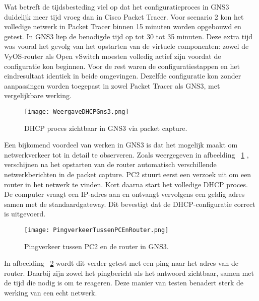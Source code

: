 \vspace{0.3cm}

Wat betreft de tijdsbesteding viel op dat het configuratieproces in GNS3 duidelijk meer tijd vroeg dan in Cisco Packet Tracer. Voor scenario 2 kon het volledige netwerk in Packet Tracer binnen 15 minuten worden opgebouwd en getest. In GNS3 liep de benodigde tijd op tot 30 tot 35 minuten. Deze extra tijd was vooral het gevolg van het opstarten van de virtuele componenten: zowel de VyOS-router als Open vSwitch moesten volledig actief zijn voordat de configuratie kon beginnen. Voor de rest waren de configuratiestappen en het eindresultaat identiek in beide omgevingen. Dezelfde configuratie kon zonder aanpassingen worden toegepast in zowel Packet Tracer als GNS3, met vergelijkbare werking.

\vspace{0.3cm}

\begin{figure}[H]
    \centering
    \texttt{[image: WeergaveDHCPGns3.png]}
    \caption{DHCP proces zichtbaar in GNS3 via packet capture.}
    \label{fig:dhcp_gns3}
\end{figure}


Een bijkomend voordeel van werken in GNS3 is dat het mogelijk maakt om netwerkverkeer tot in detail te observeren. Zoals weergegeven in afbeelding ~\ref{fig:dhcp_gns3} , verschijnen na het opstarten van de router automatisch verschillende netwerkberichten in de packet capture. PC2 stuurt eerst een verzoek uit om een router in het netwerk te vinden. Kort daarna start het volledige DHCP proces. De computer vraagt een IP-adres aan en ontvangt vervolgens een geldig adres samen met de standaardgateway. Dit bevestigt dat de DHCP-configuratie correct is uitgevoerd.

\vspace{0.3cm}

\begin{figure}[H]
    \centering
    \texttt{[image: PingverkeerTussenPCEnRouter.png]}
    \caption{Pingverkeer tussen PC2 en de router in GNS3.}
    \label{fig:ping_gns3}
\end{figure}

In afbeelding ~\ref{fig:ping_gns3} wordt dit verder getest met een ping naar het adres van de router. Daarbij zijn zowel het pingbericht als het antwoord zichtbaar, samen met de tijd die nodig is om te reageren. Deze manier van testen benadert sterk de werking van een echt netwerk.

